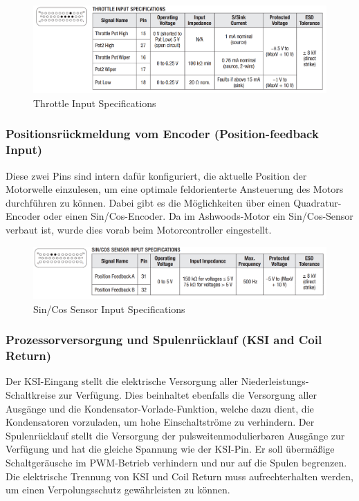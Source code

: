 \begin{figure}[H]
	\begin{center}
		\includegraphics[width=\textwidth]{figures/antrieb/Throttle_Input_Specifications.png}
		\caption{Throttle Input Specifications}
	\end{center}
\end{figure}



\subsubsection{Positionsrückmeldung vom Encoder (Position-feedback Input)}
Diese zwei Pins sind intern dafür konfiguriert, die aktuelle Position der Motorwelle einzulesen, um eine optimale feldorienterte Ansteuerung des Motors durchführen zu können. Dabei gibt es die Möglichkeiten über einen Quadratur-Encoder oder einen Sin/Cos-Encoder. Da im Ashwoods-Motor ein Sin/Cos-Sensor verbaut ist, wurde dies vorab beim Motorcontroller eingestellt.

\begin{figure}[H]
	\begin{center}
		\includegraphics[width=\textwidth]{figures/antrieb/SinCosSensor_Input_Specifications.png}
		\caption{Sin/Cos Sensor Input Specifications}
	\end{center}
\end{figure}


\newpage


\subsubsection{Prozessorversorgung und Spulenrücklauf (KSI and Coil Return)}
Der KSI-Eingang stellt die elektrische Versorgung aller Niederleistungs-Schaltkreise zur Verfügung. Dies  beinhaltet ebenfalls die Versorgung aller Ausgänge und die Kondensator-Vorlade-Funktion, welche dazu dient, die Kondensatoren vorzuladen, um hohe Einschaltströme zu verhindern. Der Spulenrücklauf stellt die Versorgung der pulsweitenmodulierbaren Ausgänge zur Verfügung und hat die gleiche Spannung wie der KSI-Pin. Er soll übermäßige Schaltgeräusche im PWM-Betrieb verhindern und nur auf die Spulen begrenzen. Die elektrische Trennung von KSI und Coil Return muss aufrechterhalten werden, um einen Verpolungsschutz gewährleisten zu können. 

